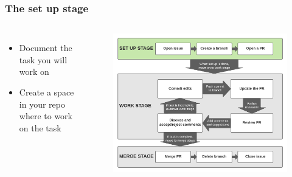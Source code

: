 \documentclass[aspectratio=169]{beamer} %
\begin{document}
\begin{frame}
	\frametitle{The set up stage}
	\begin{columns}[c]
		
		\begin{itemize}
			\setlength\itemsep{1em}
			\item Document the task you will work on
			\item Create a space in your repo where to work on the task
		\end{itemize}
		
		\vspace{-.75cm}
		\begin{figure}
			\centering
			\includegraphics[width=\textwidth]{./img/branch-pr-merge-cycle-S1.png}
		\end{figure}
		
	\end{columns}
\end{frame}
\end{document}
